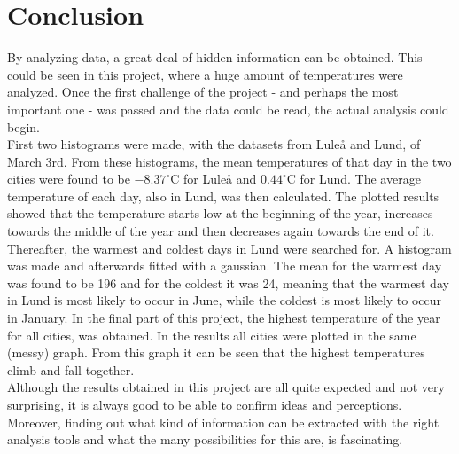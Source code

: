 \documentclass[../main.tex]{subfiles}
\begin{document}
\section{Conclusion}

By analyzing data, a great deal of hidden information can be obtained. This could be 
seen in this project, where a huge amount of temperatures were analyzed. Once the 
first challenge of the project - and perhaps the most important one - was passed and the 
data could be read, the actual analysis could begin. \\

\noindent First two histograms were made, with 
the datasets from Luleå and Lund, of March 3rd. From these histograms, the mean 
temperatures of that day in the two cities were found to be $-8.37^\circ$C for Luleå and 
$0.44^\circ$C for Lund. The average temperature of each day, also in Lund, was then calculated.
The plotted results showed that the temperature starts low at the beginning of the year, 
increases towards the middle of the year and then decreases again towards the end of it. 
Thereafter, the warmest and coldest days in Lund 
were searched for. A histogram was made and afterwards fitted with a gaussian. The mean
for the warmest day was found to be 196 and for the coldest it was 24, meaning that the 
warmest day in Lund is most likely to occur in June, while the coldest is most likely 
to occur in January. 
In the final part of this project, the highest temperature of the year for all cities, 
was obtained. In the results all cities were plotted in the same (messy) graph. From this
graph it can be seen that the highest temperatures climb and fall together. \\ 


\noindent Although the results obtained in this project are all quite expected and not very 
surprising, it is always good to be able to confirm ideas and perceptions. Moreover, finding 
out what kind of information can be extracted with the right analysis tools and what the many
possibilities for this are, is fascinating. 
\end{document}

